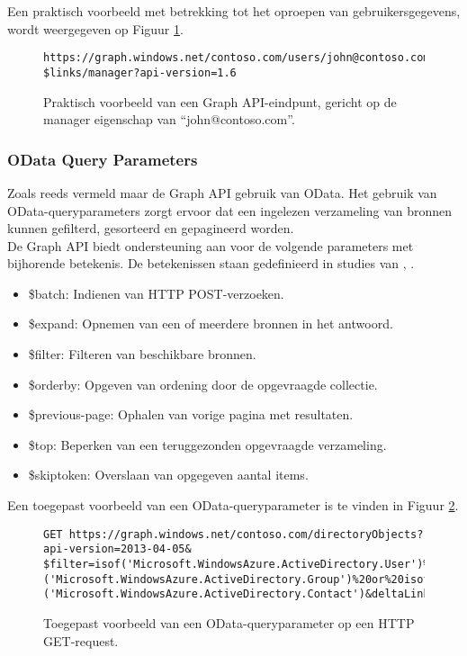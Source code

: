 Een praktisch voorbeeld met betrekking tot het oproepen van gebruikersgegevens, wordt weergegeven op Figuur \ref{pfe}. \\

\begin{figure}[h]
    \footnotesize\begin{verbatim}https://graph.windows.net/contoso.com/users/john@contoso.com/
$links/manager?api-version=1.6
    \end{verbatim}    
    \caption[Voorbeeld Graph API-eindpunt]{Praktisch voorbeeld van een Graph \ac{API}-eindpunt, gericht op de manager eigenschap van “john@contoso.com”.}
    \label{pfe}
\end{figure}

\subsubsection{OData Query Parameters}

Zoals reeds vermeld maar de Graph \ac{API} gebruik van OData. Het gebruik van OData-queryparameters zorgt ervoor dat een ingelezen verzameling van bronnen kunnen gefilterd, gesorteerd en gepagineerd worden. \\

De Graph \ac{API} biedt ondersteuning aan voor de volgende parameters met bijhorende betekenis. De betekenissen staan gedefinieerd in studies van \textcite{Liang2016}, \textcite{Wojcieszyn2014}. 

\begin{itemize}
    \item \$batch: Indienen van \ac{HTTP} POST-verzoeken.
    \item \$expand: Opnemen van een of meerdere bronnen in het antwoord.
    \item \$filter: Filteren van beschikbare bronnen.
    \item \$orderby: Opgeven van ordening door de opgevraagde collectie.
    \item \$previous-page: Ophalen van vorige pagina met resultaten.
    \item \$top: Beperken van een teruggezonden opgevraagde verzameling.
    \item \$skiptoken: Overslaan van opgegeven aantal items.
\end{itemize}

Een toegepast voorbeeld van een OData-queryparameter is te vinden in Figuur \ref{odqp}. \\

\begin{figure}[h]
\footnotesize\begin{verbatim}GET https://graph.windows.net/contoso.com/directoryObjects?api-version=2013-04-05&
$filter=isof('Microsoft.WindowsAzure.ActiveDirectory.User')%20or%20isof
('Microsoft.WindowsAzure.ActiveDirectory.Group')%20or%20isof
('Microsoft.WindowsAzure.ActiveDirectory.Contact')&deltaLink=HTTP/1.1
\end{verbatim}    
\caption[Voorbeeld OData-queryparamter]{Toegepast voorbeeld van een OData-queryparameter op een \ac{HTTP} GET-request.}
\label{odqp}
\end{figure}

